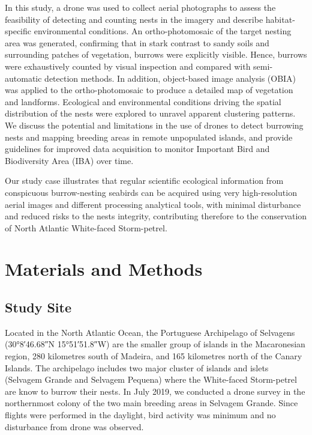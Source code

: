 \documentclass[12pt]{article}
\begin{document}
In this study, a drone was used to collect aerial photographs to assess the feasibility of detecting and counting nests in the imagery and describe habitat-specific environmental conditions. An ortho-photomosaic of the target nesting area was generated, confirming that in stark contrast to sandy soils and surrounding patches of vegetation, burrows were explicitly visible. Hence, burrows were exhaustively counted by visual inspection and compared with semi-automatic detection methods. In addition, object-based image analysis (OBIA) was applied to the ortho-photomosaic to produce a detailed map of vegetation and landforms. Ecological and environmental conditions driving the spatial distribution of the nests were explored to unravel apparent clustering patterns. We discuss the potential and limitations in the use of drones to detect burrowing nests and mapping breeding areas in remote unpopulated islands, and provide guidelines for improved data acquisition to monitor Important Bird and Biodiversity Area (IBA) over time. 

Our study case illustrates that regular scientific ecological information from conspicuous burrow-nesting seabirds can be acquired using very high-resolution aerial images and different processing analytical tools, with minimal disturbance and reduced risks to the nests integrity, contributing therefore to the conservation of North Atlantic White-faced Storm-petrel.

\section{Materials and Methods}

\subsection{Study Site}

Located in the North Atlantic Ocean, the Portuguese Archipelago of Selvagens (\ang{30;8;46.68}N \ang{15;51;51.8}W) are the smaller group of islands in the Macaronesian region, 280 kilometres  south of Madeira, and 165 kilometres north of  the Canary Islands. The archipelago includes two major cluster of islands and islets (Selvagem Grande and Selvagem Pequena) where the White-faced Storm-petrel are know to burrow their nests. In July 2019, we conducted a drone survey in the northernmost colony of the two main breeding areas in Selvagem Grande.  Since flights were performed in the daylight, bird activity was minimum and no disturbance from drone was observed.
\end{document}
